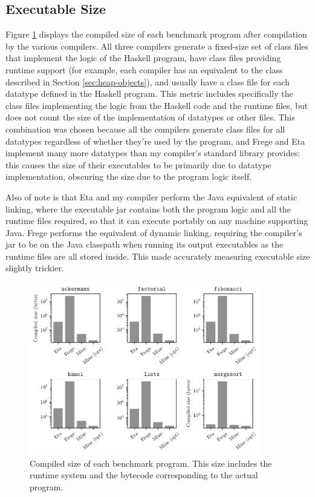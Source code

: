 \documentclass[dissertation.tex]{subfiles}
\begin{document}
{    \subsection{Executable Size}
    {
        Figure \ref{fig:executable-size} displays the compiled size of each benchmark program after compilation by the various compilers. All three compilers generate a fixed-size set of class files that implement the logic of the Haskell program, have class files providing runtime support (for example, each compiler has an equivalent to the  class described in Section \ref{sec:heap-objects}), and usually have a class file for each datatype defined in the Haskell program. This metric includes specifically the class files implementing the logic from the Haskell code and the runtime files, but does not count the size of the implementation of datatypes or other files. This combination was chosen because all the compilers generate class files for all datatypes regardless of whether they're used by the program, and Frege and Eta implement many more datatypes than my compiler's standard library provides: this causes the size of their executables to be primarily due to datatype implementation, obscuring the size due to the program logic itself.

        Also of note is that Eta and my compiler perform the Java equivalent of static linking, where the executable jar contains both the program logic and all the runtime files required, so that it can execute portably on any machine supporting Java. Frege performs the equivalent of dynamic linking, requiring the compiler's jar to be on the Java classpath when running its output executables as the runtime files are all stored inside. This made accurately measuring executable size slightly trickier.

        \begin{figure}[H]
            \centering
            \captionsetup{width=0.8\textwidth}
            \includegraphics[width=0.9\textwidth]{graphs/size.pdf}
            \caption{Compiled size of each benchmark program. This size includes the runtime system and the bytecode corresponding to the actual program.}
            \label{fig:executable-size}
        \end{figure}
    }
}
\end{document}
